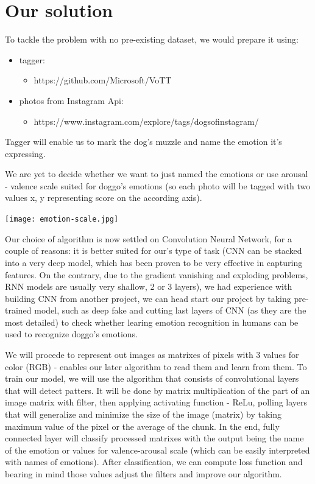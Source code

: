 \documentclass[11pt]{diazessay} %
\begin{document}

\section*{Our solution}
To tackle the problem with no pre-existing dataset, we would prepare it using:
	\begin{itemize}
		\item tagger: 
			\begin{itemize}
				\item https://github.com/Microsoft/VoTT
			\end{itemize}
		\item photos from Instagram Api: 
			\begin{itemize}
				\item https://www.instagram.com/explore/tags/dogsofinstagram/
			\end{itemize}
		
	\end{itemize}
Tagger will enable us to mark the dog's muzzle and name the emotion it's expressing.

We are yet to decide whether we want to just named the emotions or use arousal - valence scale suited for doggo's emotions (so each photo will be tagged with two values x, y representing score on the according axis).
  
\begin{center}%
	\texttt{[image: emotion-scale.jpg]}
\end{center}

Our choice of algorithm is now settled on Convolution Neural Network, for a couple of reasons: it is better suited for our's type of task (CNN can be stacked into a very deep model, which has been proven to be very effective in capturing features. On the contrary, due to the gradient vanishing and exploding problems, RNN models are usually very shallow, 2 or 3 layers), we had experience with building CNN from another project, we can head start our project by taking pre-trained model, such as deep fake and cutting last layers of CNN (as they are the most detailed) to check whether learing emotion recognition in humans can be used to recognize doggo's emotions.

We will procede to represent out images as matrixes of pixels with 3 values for color (RGB) - enables our later algorithm to read them and learn from them. 
To train our model, we will use the algorithm that consists of convolutional layers that will detect patters. It will be done by matrix multiplication of the part of an image matrix with filter, then applying activating function - ReLu, polling layers that will generalize and minimize the size of the image (matrix) by taking maximum value of the pixel or the average of the chunk. In the end, fully connected layer will classify processed matrixes with the output being the name of the emotion or values for valence-arousal scale (which can be easily interpreted with names of emotions). 
After classification, we can compute loss function and bearing in mind those values adjust the filters and improve our algorithm.
\end{document}
